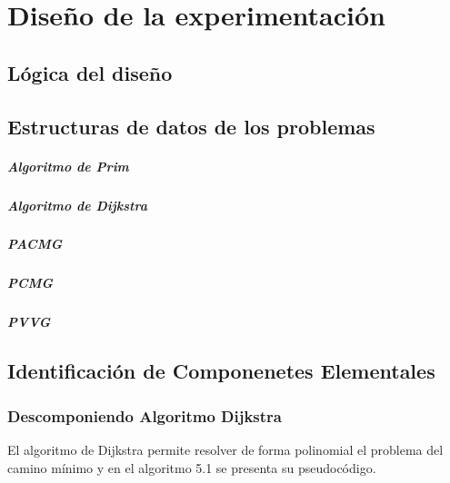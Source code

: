 \chapter{Diseño de la experimentación}\label{cap:disegno_experimento}

\section{Lógica del diseño}\label{cap:logica_diseno}
\section{Estructuras de datos de los problemas}
\paragraph{Algoritmo de Prim}
\paragraph{Algoritmo de Dijkstra}
\paragraph{PACMG}
\paragraph{PCMG}
\paragraph{PVVG}

\section{Identificación de Componenetes Elementales}\label{cap:identificacion_componentes}


\subsection{Descomponiendo Algoritmo Dijkstra}
El algoritmo de Dijkstra permite resolver de forma polinomial el problema del camino mínimo
y en el algoritmo 5.1 se presenta su pseudocódigo.

